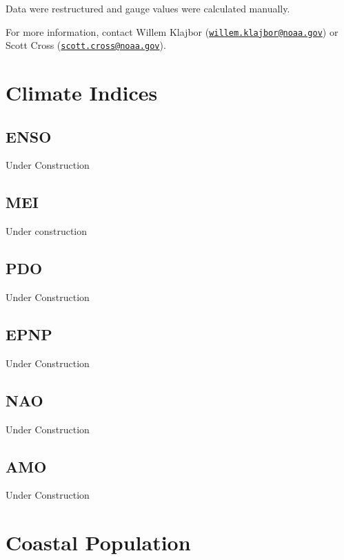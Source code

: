 \documentclass[
]{book}
\begin{document}
Data were restructured and gauge values were calculated manually.

For more information, contact Willem Klajbor (\href{mailto:willem.klajbor@noaa.gov}{\nolinkurl{willem.klajbor@noaa.gov}}) or Scott Cross (\href{mailto:scott.cross@noaa.gov}{\nolinkurl{scott.cross@noaa.gov}}).

\hypertarget{climate-indices}{%
\chapter{Climate Indices}\label{climate-indices}}

\hypertarget{enso}{%
\section{ENSO}\label{enso}}

Under Construction

\hypertarget{mei}{%
\section{MEI}\label{mei}}

Under construction

\hypertarget{pdo}{%
\section{PDO}\label{pdo}}

Under Construction

\hypertarget{epnp}{%
\section{EPNP}\label{epnp}}

Under Construction

\hypertarget{nao}{%
\section{NAO}\label{nao}}

Under Construction

\hypertarget{amo}{%
\section{AMO}\label{amo}}

Under Construction

\hypertarget{coastal-population}{%
\chapter{Coastal Population}\label{coastal-population}}
\end{document}
